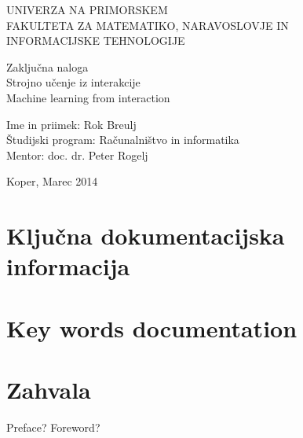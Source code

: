\documentclass[a4paper, oneside, 12pt]{article}
\begin{document}
\begin{titlepage}
\begin{center}
\begin{large}
UNIVERZA NA PRIMORSKEM\\
FAKULTETA ZA MATEMATIKO, NARAVOSLOVJE IN\\
INFORMACIJSKE TEHNOLOGIJE\\[6cm]
\end{large}
\end{center}

\begin{center}
Zaključna naloga\\
{\large Strojno učenje iz interakcije}\\
Machine learning from interaction\\[6cm]
\end{center}

\noindent
Ime in priimek: Rok Breulj\\
Študijski program: Računalništvo in informatika\\
Mentor: doc. dr. Peter Rogelj\\

\vfill
\begin{center}
{\large Koper, Marec 2014}
\end{center}
\end{titlepage}

\section*{Ključna dokumentacijska informacija}
\newpage

\section*{Key words documentation}
\newpage

\section*{Zahvala}
Preface? Foreword?
\newpage

\tableofcontents
\newpage
\end{document}
